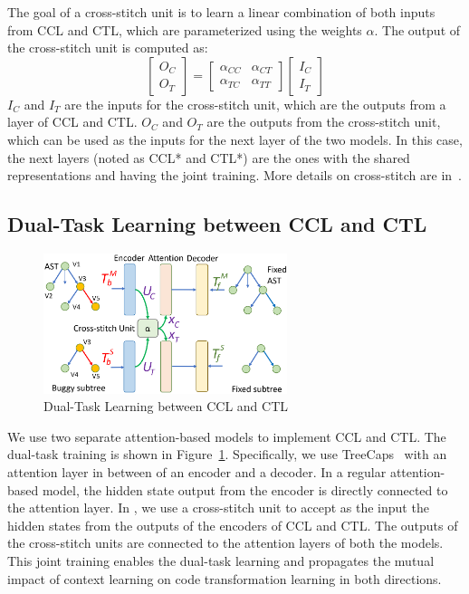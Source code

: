 The goal of a cross-stitch unit is to learn a linear combination of
both inputs from CCL and CTL, which are parameterized
using the weights $\alpha$. The output of the cross-stitch unit is
computed as:
\begin{equation}\label{eq:cross-stitch}
	\begin{bmatrix}
		O_C\\
		O_T
	\end{bmatrix}
	=
	\begin{bmatrix}
		\alpha_{CC} &  \alpha_{CT} \\
		\alpha_{TC} &  \alpha_{TT}
	\end{bmatrix}
	\begin{bmatrix}
		I_C\\
		I_T
	\end{bmatrix}
\end{equation}
$I_C$ and $I_T$ are the inputs for the cross-stitch unit, which are
the outputs from a layer of CCL and CTL. $O_C$ and $O_T$ are the
outputs from the cross-stitch unit, which can be used as the inputs
for the next layer of the two models. In this case, the next layers
(noted as CCL* and CTL*) are the ones with the shared representations
and having the joint training. More details on cross-stitch are
in~\cite{misra2016cross}.

\subsection{Dual-Task Learning between CCL and CTL}

\begin{figure}[t]
	\centering
	\includegraphics[width=2.8in]{graphs/dual-learning-repair.png}
        \vspace{-9pt}
	\caption{Dual-Task Learning between CCL and CTL}
	\label{fig:dual-learning}
\end{figure}

We use two separate attention-based  models to implement
CCL and CTL. The dual-task training is shown in
Figure~\ref{fig:dual-learning}. Specifically, we use
TreeCaps~\cite{bui2021treecaps} with an attention layer in between of
an encoder and a decoder. In a regular attention-based 
model, the hidden state output from the encoder is directly connected
to the attention layer. In {\tool}, we use a
cross-stitch unit to accept as the input the hidden states from the
outputs of the encoders of CCL and CTL. The outputs of the cross-stitch
units are connected to the attention layers of both the models. This
joint training enables the dual-task learning and propagates the mutual impact of
context learning on code transformation learning in both directions.

